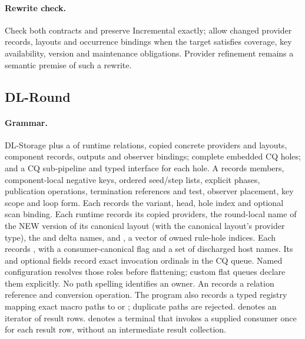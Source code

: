 \paragraph{Rewrite check.} Check both contracts and preserve Incremental exactly;
allow changed provider records, layouts and occurrence bindings when the target
satisfies coverage, key availability, version and maintenance obligations.
Provider refinement remains a semantic premise of such a rewrite.

\subsection{DL-Round}
\paragraph{Grammar.} DL-Storage plus a  of runtime
relations, copied concrete providers and layouts, component 
records, outputs and observer bindings; complete embedded CQ holes; and a
CQ sub-pipeline and typed interface for each hole. A  records
members, component-local negative keys, ordered seed/step 
lists, explicit phases, publication operations, termination references and test,
observer placement, key scope and loop form. Each  records the variant, head,
hole index and optional scan binding. Each runtime  records its
copied providers, the round-local name  of the NEW version
of its canonical layout (with the canonical layout's provider type), the
 and delta names, and , a vector of owned rule-hole
indices. Each  records , with a
consumer-canonical flag and a set of discharged host names.
Its  and optional  fields record exact invocation ordinals
in the CQ queue. Named configuration resolves those roles before flattening;
custom flat queues declare them explicitly. No path spelling identifies an owner.
An  records a relation reference and conversion operation.
The program also records a typed  registry mapping exact macro
paths to  or ; duplicate paths are rejected.
 denotes an iterator of result rows.
 denotes a terminal that invokes a supplied consumer
once for each result row, without an intermediate result collection.
